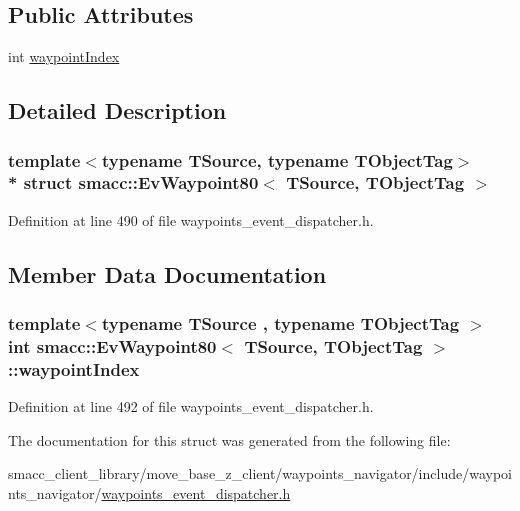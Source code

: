 \subsection*{Public Attributes}
\begin{DoxyCompactItemize}
\item 
int \hyperlink{structsmacc_1_1EvWaypoint80_a2073ccffead74ab563f57d0259279ba1}{waypoint\+Index}
\end{DoxyCompactItemize}


\subsection{Detailed Description}
\subsubsection*{template$<$typename T\+Source, typename T\+Object\+Tag$>$\\*
struct smacc\+::\+Ev\+Waypoint80$<$ T\+Source, T\+Object\+Tag $>$}



Definition at line 490 of file waypoints\+\_\+event\+\_\+dispatcher.\+h.



\subsection{Member Data Documentation}
\subsubsection[{\texorpdfstring{waypoint\+Index}{waypointIndex}}]{\setlength{\rightskip}{0pt plus 5cm}template$<$typename T\+Source , typename T\+Object\+Tag $>$ int {\bf smacc\+::\+Ev\+Waypoint80}$<$ T\+Source, T\+Object\+Tag $>$\+::waypoint\+Index}\hypertarget{structsmacc_1_1EvWaypoint80_a2073ccffead74ab563f57d0259279ba1}{}\label{structsmacc_1_1EvWaypoint80_a2073ccffead74ab563f57d0259279ba1}


Definition at line 492 of file waypoints\+\_\+event\+\_\+dispatcher.\+h.



The documentation for this struct was generated from the following file\+:\begin{DoxyCompactItemize}
\item 
smacc\+\_\+client\+\_\+library/move\+\_\+base\+\_\+z\+\_\+client/waypoints\+\_\+navigator/include/waypoints\+\_\+navigator/\hyperlink{waypoints__event__dispatcher_8h}{waypoints\+\_\+event\+\_\+dispatcher.\+h}\end{DoxyCompactItemize}
